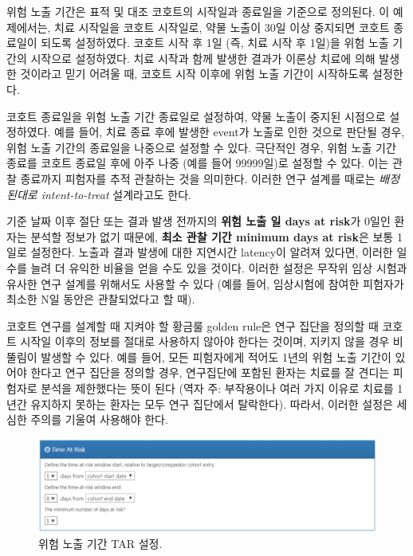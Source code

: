 \documentclass[10.5pt]{book}
\theoremstyle{definition}
\theoremstyle{definition}
\theoremstyle{definition}
\theoremstyle{remark}
\let\BeginKnitrBlock\begin \let\EndKnitrBlock\end
\begin{document}
위험 노출 기간은 표적 및 대조 코호트의 시작일과 종료일을 기준으로
정의된다. 이 예제에서는, 치료 시작일을 코호트 시작일로, 약물 노출이 30일
이상 중지되면 코호트 종료일이 되도록 설정하였다. 코호트 시작 후 1일 (즉,
치료 시작 후 1일)을 위험 노출 기간의 시작으로 설정하였다. 치료 시작과
함께 발생한 결과가 이론상 치료에 의해 발생한 것이라고 믿기 어려울 때,
코호트 시작 이후에 위험 노출 기간이 시작하도록 설정한다.

코호트 종료일을 위험 노출 기간 종료일로 설정하여, 약물 노출이 중지된
시점으로 설정하였다. 예를 들어, 치료 종료 후에 발생한 event가 노출로
인한 것으로 판단될 경우, 위험 노출 기간의 종료일을 나중으로 설정할 수
있다. 극단적인 경우, 위험 노출 기간 종료를 코호트 종료일 후에 아주 나중
(예를 들어 99999일)로 설정할 수 있다. 이는 관찰 종료까지 피험자를 추적
관찰하는 것을 의미한다. 이러한 연구 설계를 때로는 \emph{배정된대로
intent-to-treat} 설계라고도 한다.

기준 날짜 이후 절단 또는 결과 발생 전까지의 \textbf{위험 노출 일 days at
risk}가 0일인 환자는 분석할 정보가 없기 때문에, \textbf{최소 관찰 기간
minimum days at risk}은 보통 1일로 설정한다. 노출과 결과 발생에 대한
지연시간 latency이 알려져 있다면, 이러한 일수를 늘려 더 유익한 비율을
얻을 수도 있을 것이다. 이러한 설정은 무작위 임상 시험과 유사한 연구
설계를 위해서도 사용할 수 있다 (예를 들어, 임상시험에 참여한 피험자가
최소한 N일 동안은 관찰되었다고 할 때).

\BeginKnitrBlock{rmdimportant}
코호트 연구를 설계할 때 지켜야 할 황금룰 golden rule은 연구 집단을
정의할 때 코호트 시작일 이후의 정보를 절대로 사용하지 않아야 한다는
것이며, 지키지 않을 경우 비뚤림이 발생할 수 있다. 예를 들어, 모든
피험자에게 적어도 1년의 위험 노출 기간이 있어야 한다고 연구 집단을
정의할 경우, 연구집단에 포함된 환자는 치료를 잘 견디는 피험자로 분석을
제한했다는 뜻이 된다 (역자 주: 부작용이나 여러 가지 이유로 치료를 1년간
유지하지 못하는 환자는 모두 연구 집단에서 탈락한다). 따라서, 이러한
설정은 세심한 주의를 기울여 사용해야 한다.
\EndKnitrBlock{rmdimportant}

\begin{figure}

{\centering \includegraphics[width=1\linewidth]{images/PopulationLevelEstimation/timeAtRisk} 

}

\caption{위험 노출 기간 TAR 설정.}\label{fig:timeAtRisk}
\end{figure}
\end{document}
